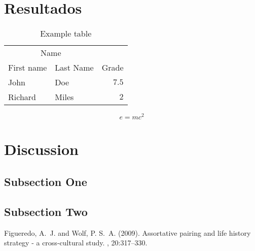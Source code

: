 \documentclass[twoside]{article}
\begin{document}
\begin{multicols}{2}
\section*{Resultados}

\begin{table}[H]
\caption{Example table}
\centering
\begin{tabular}{llr}
\toprule
\multicolumn{2}{c}{Name} \\
\cmidrule(r){1-2}
First name & Last Name & Grade \\
\midrule
John & Doe & $7.5$ \\
Richard & Miles & $2$ \\
\bottomrule
\end{tabular}
\end{table}

\lipsum[5] %

\begin{equation}
\label{eq:emc}
e = mc^2
\end{equation}

\lipsum[6] %


\section{Discussion}

\subsection{Subsection One}

\lipsum[7] %

\subsection{Subsection Two}

\lipsum[8] %


\begin{thebibliography}{99} %

Figueredo, A.~J. and Wolf, P. S.~A. (2009).
\newblock Assortative pairing and life history strategy - a cross-cultural
  study.
, 20:317--330.
 
\end{thebibliography}


\end{multicols}
\end{document}
